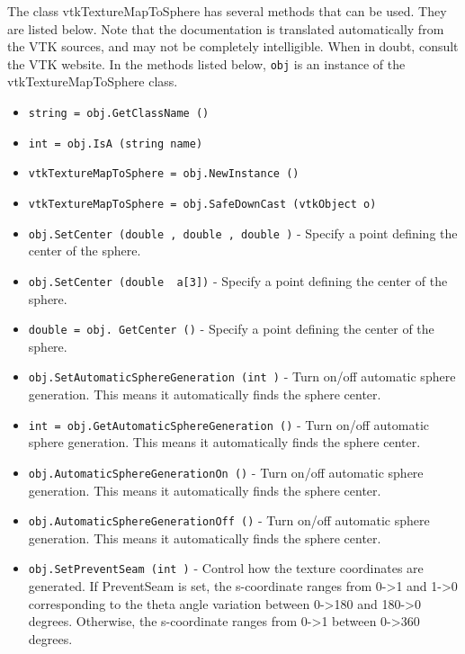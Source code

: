 The class vtkTextureMapToSphere has several methods that can be used.
  They are listed below.
Note that the documentation is translated automatically from the VTK sources,
and may not be completely intelligible.  When in doubt, consult the VTK website.
In the methods listed below, \verb|obj| is an instance of the vtkTextureMapToSphere class.
\begin{itemize}
\item  \verb|string = obj.GetClassName ()|

\item  \verb|int = obj.IsA (string name)|

\item  \verb|vtkTextureMapToSphere = obj.NewInstance ()|

\item  \verb|vtkTextureMapToSphere = obj.SafeDownCast (vtkObject o)|

\item  \verb|obj.SetCenter (double , double , double )| -  Specify a point defining the center of the sphere.

\item  \verb|obj.SetCenter (double  a[3])| -  Specify a point defining the center of the sphere.

\item  \verb|double = obj. GetCenter ()| -  Specify a point defining the center of the sphere.

\item  \verb|obj.SetAutomaticSphereGeneration (int )| -  Turn on/off automatic sphere generation. This means it automatically
 finds the sphere center.

\item  \verb|int = obj.GetAutomaticSphereGeneration ()| -  Turn on/off automatic sphere generation. This means it automatically
 finds the sphere center.

\item  \verb|obj.AutomaticSphereGenerationOn ()| -  Turn on/off automatic sphere generation. This means it automatically
 finds the sphere center.

\item  \verb|obj.AutomaticSphereGenerationOff ()| -  Turn on/off automatic sphere generation. This means it automatically
 finds the sphere center.

\item  \verb|obj.SetPreventSeam (int )| -  Control how the texture coordinates are generated. If PreventSeam is
 set, the s-coordinate ranges from 0->1 and 1->0 corresponding to the
 theta angle variation between 0->180 and 180->0 degrees. Otherwise, the
 s-coordinate ranges from 0->1 between 0->360 degrees.


\end{itemize}
